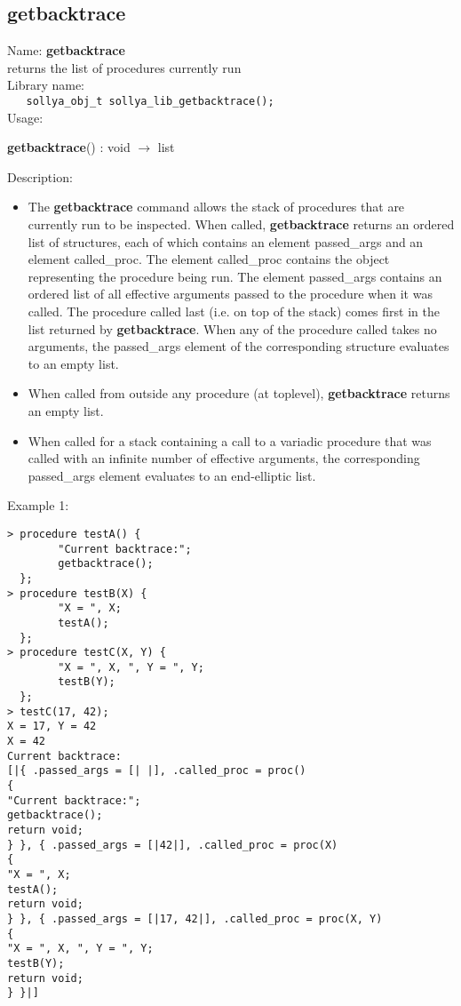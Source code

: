 \subsection{getbacktrace}
\label{labgetbacktrace}
\noindent Name: \textbf{getbacktrace}\\
\phantom{aaa}returns the list of \sollya procedures currently run\\[0.2cm]
\noindent Library name:\\
\verb|   sollya_obj_t sollya_lib_getbacktrace();|\\[0.2cm]
\noindent Usage: 
\begin{center}
\textbf{getbacktrace}() : \textsf{void} $\rightarrow$ \textsf{list}\\
\end{center}
\noindent Description: \begin{itemize}

\item The \textbf{getbacktrace} command allows the stack of \sollya procedures that are
   currently run to be inspected. When called, \textbf{getbacktrace} returns an
   ordered list of structures, each of which contains an element
   passed\_args and an element called\_proc. The element called\_proc
   contains the \sollya object representing the procedure being run. The
   element passed\_args contains an ordered list of all effective
   arguments passed to the procedure when it was called. The procedure called
   last (i.e. on top of the stack) comes first in the list returned
   by \textbf{getbacktrace}. When any of the procedure called takes no arguments, the
   passed\_args element of the corresponding structure evaluates to an empty
   list.

\item When called from outside any procedure (at toplevel), \textbf{getbacktrace} returns
   an empty list.

\item When called for a stack containing a call to a variadic procedure that was
   called with an infinite number of effective arguments, the corresponding
   passed\_args element evaluates to an end-elliptic list.
\end{itemize}
\noindent Example 1: 
\begin{center}\begin{minipage}{15cm}\begin{Verbatim}[frame=single]
> procedure testA() {
        "Current backtrace:";
        getbacktrace();
  };
> procedure testB(X) {
        "X = ", X;
        testA();
  };
> procedure testC(X, Y) {
        "X = ", X, ", Y = ", Y;
        testB(Y);
  };
> testC(17, 42);
X = 17, Y = 42
X = 42
Current backtrace:
[|{ .passed_args = [| |], .called_proc = proc()
{
"Current backtrace:";
getbacktrace();
return void;
} }, { .passed_args = [|42|], .called_proc = proc(X)
{
"X = ", X;
testA();
return void;
} }, { .passed_args = [|17, 42|], .called_proc = proc(X, Y)
{
"X = ", X, ", Y = ", Y;
testB(Y);
return void;
} }|]
\end{Verbatim}
\end{minipage}\end{center}
